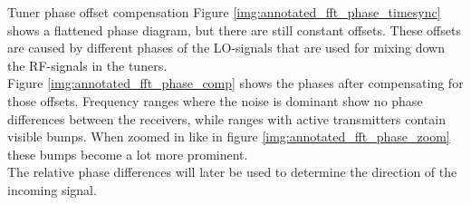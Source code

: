 \begin{subchapter}{Tuner phase offset compensation}
  Figure \ref{img:annotated_fft_phase_timesync} shows a flattened
  phase diagram, but there are still constant offsets.
  These offsets are caused by different phases of the LO-signals
  that are used for mixing down the RF-signals in the tuners. \\

  Figure \ref{img:annotated_fft_phase_comp} shows the phases
  after compensating for those offsets. Frequency ranges where
  the noise is dominant show no phase differences between
  the receivers, while ranges with active transmitters contain
  visible bumps. When zoomed in like in figure \ref{img:annotated_fft_phase_zoom}
  these bumps become a lot more prominent. \\

  The relative phase differences will later be used to
  determine the direction of the incoming signal.
\end{subchapter}
